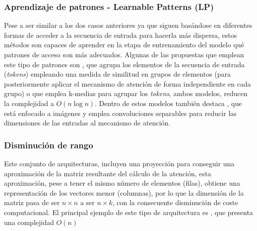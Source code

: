 \subsubsection{Aprendizaje de patrones - Learnable Patterns (LP)}
Pese a ser similar a los dos casos anteriores ya que siguen basándose en diferentes formas de acceder a la secuencia de entrada para hacerla más dispersa, estos métodos son capaces de aprender en la etapa de entrenamiento del modelo qué patrones de acceso son más adecuados. Algunas de las propuestas que emplean este tipo de patrones son  \cite{Kitaev2020Reformer:}, que agrupa los elementos de la secuencia de entrada (\textit{tokens}) empleando una medida de similitud en grupos de elementos (para posteriormente aplicar el mecanismo de atención de forma independiente en cada grupo) o  \cite{routingtransformer} que emplea k-medias para agrupar los \textit{tokens}, ambos modelos, reducen la complejidad a $O(n \log n)$. Dentro de estos modelos también destaca  \cite{zhql2021ResT}, que está enfocado a imágenes y emplea convoluciones separables para reducir las dimensiones de las entradas al mecanismo de atención.


\subsubsection{Disminución de rango}
Este conjunto de arquitecturas, incluyen una proyección para conseguir una aproximación de la matriz resultante del cálculo de la atención, esta aproximación, pese a tener el mismo número de elementos (filas), obtiene una representación de los vectores menor (columnas), por lo que la dimensión de la matriz pasa de ser $n \times n$ a ser $n \times k$, con la consecuente disminución de coste computacional. El principal ejemplo de este tipo de arquitectura es , \cite{wang2020linformer} que presenta una complejidad $O(n)$

